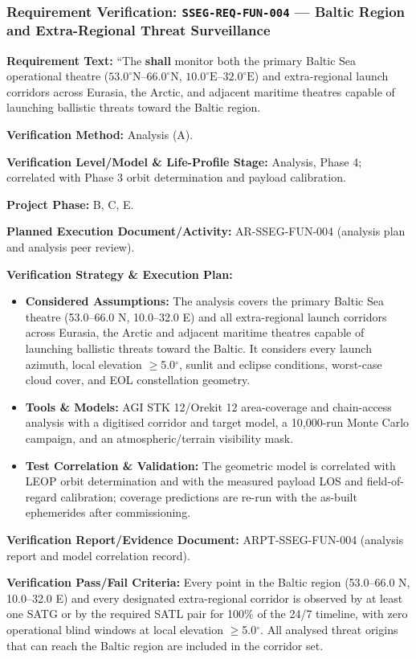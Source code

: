 \subsubsection{Requirement Verification: \texttt{SSEG-REQ-FUN-004} --- Baltic Region and Extra-Regional Threat Surveillance}
\label{ver:SSEG-REQ-FUN-004}
\textbf{Requirement Text:} ``The  \textbf{shall} monitor both the primary Baltic Sea operational theatre ($53.0^\circ\text{N}\text{--}66.0^\circ\text{N}$, $10.0^\circ\text{E}\text{--}32.0^\circ\text{E}$) and extra-regional launch corridors across Eurasia, the Arctic, and adjacent maritime theatres capable of launching ballistic threats toward the Baltic region.
\par\textbf{Verification Method:} Analysis (A).
\par\textbf{Verification Level/Model \& Life-Profile Stage:} Analysis, Phase 4; correlated with Phase 3 orbit determination and payload calibration.
\par\textbf{Project Phase:} B, C, E.
\par\textbf{Planned Execution Document/Activity:} AR-SSEG-FUN-004 (analysis plan and analysis peer review).
\par\textbf{Verification Strategy \& Execution Plan:}
\begin{itemize}
\item \textbf{Considered Assumptions:} The analysis covers the primary Baltic Sea theatre (53.0--66.0 N, 10.0--32.0 E) and all extra-regional launch corridors across Eurasia, the Arctic and adjacent maritime theatres capable of launching ballistic threats toward the Baltic. It considers every launch azimuth, local elevation $\ge$5.0$^\circ$, sunlit and eclipse conditions, worst-case cloud cover, and EOL constellation geometry.
\item \textbf{Tools \& Models:} AGI STK 12/Orekit 12 area-coverage and chain-access analysis with a digitised corridor and target model, a 10,000-run Monte Carlo campaign, and an atmospheric/terrain visibility mask.
\item \textbf{Test Correlation \& Validation:} The geometric model is correlated with LEOP orbit determination and with the measured payload LOS and field-of-regard calibration; coverage predictions are re-run with the as-built ephemerides after commissioning.
\end{itemize}
\par\textbf{Verification Report/Evidence Document:} ARPT-SSEG-FUN-004 (analysis report and model correlation record).
\par\textbf{Verification Pass/Fail Criteria:} Every point in the Baltic region (53.0--66.0 N, 10.0--32.0 E) and every designated extra-regional corridor is observed by at least one SATG or by the required SATL pair for 100\% of the 24/7 timeline, with zero operational blind windows at local elevation $\ge$5.0$^\circ$. All analysed threat origins that can reach the Baltic region are included in the corridor set.
\par\medskip
